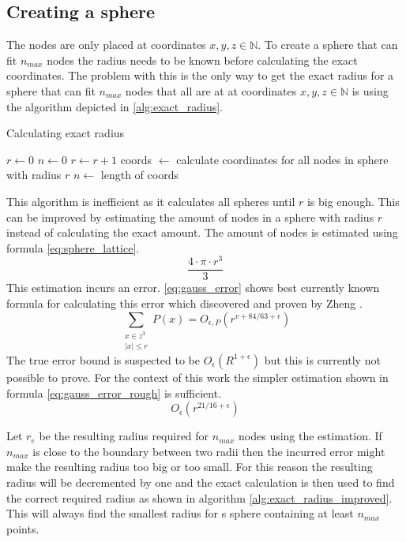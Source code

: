 \subsection{Creating a sphere}
The nodes are only placed at coordinates $x,y,z \in \mathbb{N}$. To create a sphere that can fit $n_{max}$ nodes the radius needs to be known before calculating the exact coordinates. The problem with this is the only way to get the exact radius for a sphere that can fit $n_{max}$ nodes that all are at at coordinates $x,y,z \in \mathbb{N}$ is using the algorithm depicted in \ref{alg:exact_radius}.
\begin{algorithm}
\caption{Calculating exact radius}
\label{alg:exact_radius}
\begin{algorithmic}
\State $r \gets 0$
\State $n \gets 0$
    \State $r \gets r+1$
    \State coords $\gets$ calculate coordinates for all nodes in sphere with radius $r$
    \State $n \gets $ length of coords
\EndWhile
\end{algorithmic}
\end{algorithm}
This algorithm is inefficient as it calculates all spheres until $r$ is big enough. This can be improved by estimating the amount of nodes in a sphere with radius $r$ instead of calculating the exact amount. The amount of nodes is estimated using formula \ref{eq:sphere_lattice}.
\begin{equation}
\label{eq:sphere_lattice}
    \dfrac{4 \cdot \pi \cdot r^3}{3}
\end{equation}
This estimation incurs an error. \ref{eq:gauss_error} shows best currently known formula for calculating this error which discovered and proven by Zheng \cite{gaussSphereProblem}.
\begin{equation}
\label{eq:gauss_error}
    \sum_{\substack{x \in z^3 \\ |x| \leq r}}{P(x)} = O_{\epsilon, P}(r^{v + 84 / 63 + \epsilon})
\end{equation}
The true error bound is suspected to be $O_\epsilon(R^{1 + \epsilon})$ but this is currently not possible to prove. For the context of this work the simpler estimation shown in formula \ref{eq:gauss_error_rough} is sufficient.
\begin{equation}
\label{eq:gauss_error_rough}
    O_{\epsilon}(r^{21/16 + \epsilon})
\end{equation}

Let $r_e$ be the resulting radius required for $n_{max}$ nodes using the estimation. If $n_{max}$ is close to the boundary between two radii then the incurred error might make the resulting radius too big or too small. For this reason the resulting radius will be decremented by one and the exact calculation is then used to find the correct required radius as shown in algorithm \ref{alg:exact_radius_improved}. This will always find the smallest radius for s sphere containing at least $n_{max}$ points.

